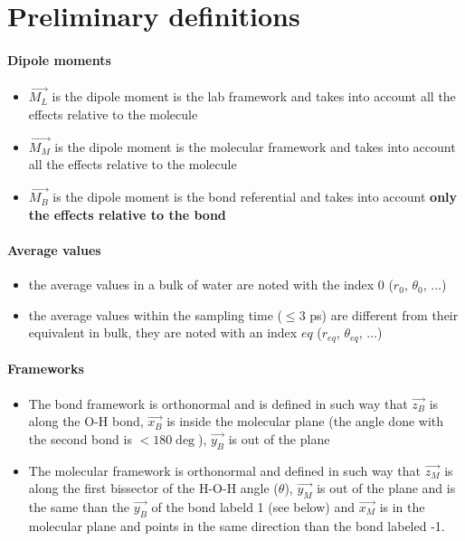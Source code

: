 \documentclass[12pt,a4paper]{article}
\newcommand{\ML}{\overrightarrow{M_L}}
\newcommand{\MM}{\overrightarrow{M_M}}
\newcommand{\MB}{\overrightarrow{M_B}}
\newcommand{\xB}{\overrightarrow{x_B}}
\newcommand{\yB}{\overrightarrow{y_B}}
\newcommand{\zB}{\overrightarrow{z_B}}
\newcommand{\xM}{\overrightarrow{x_M}}
\newcommand{\yM}{\overrightarrow{y_M}}
\newcommand{\zM}{\overrightarrow{z_M}}
\begin{document}
\section{Preliminary definitions}
\paragraph{Dipole moments}
\begin{itemize}
\item $\ML$ is the dipole moment is the lab framework and takes into account all the effects relative to the molecule
\item $\MM$ is the dipole moment is the molecular framework and takes into account all the effects relative to the molecule
\item $\MB$ is the dipole moment is the bond referential and takes into account \textbf{only the effects relative to the bond}
\end{itemize}

\paragraph{Average values}
\begin{itemize}
\item the average values in a bulk of water are noted with the index $0$ ($r_0$, $\theta_0$, ...)
\item the average values within the sampling time ($\le 3$ ps) are different from their equivalent in bulk, they are noted with an index $eq$ ($r_{eq}$, $\theta_{eq}$, ...)
\end{itemize}

\paragraph{Frameworks}
\begin{itemize}
\item The bond framework is orthonormal and is defined in such way that $\zB$ is along the O-H bond, $\xB$ is inside the molecular plane (the angle done with the second bond is $<180\deg$), $\yB$ is out of the plane
\item The molecular framework is orthonormal and defined in such way that $\zM$ is along the first bissector of the H-O-H angle ($\theta$), $\yM$ is out of the plane and is the same than the $\yB$ of the bond labeld 1 (see below) and $\xM$ is in the molecular plane and points in the same direction than the bond labeled -1.
\end{itemize}
\end{document}
